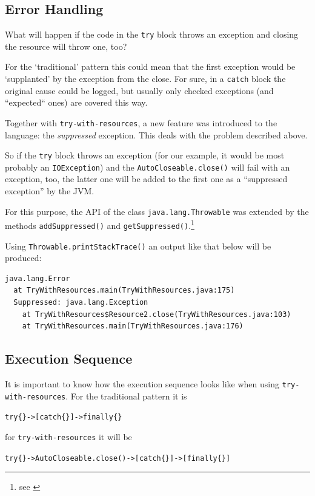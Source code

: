 \documentclass[11pt,a4paper, titlepage, parskip=half, headsepline, footsepline, cleardoublepage=current, headheight=1cm]{scrbook}
\begin{document}
\subsection{Error Handling}
What will happen if the code in the \lstinline|try| block throws an exception and closing the resource will throw one, too?

For the ‘traditional’ pattern this could mean that the first exception would be ‘supplanted’ by the exception from the close. For sure, in a \lstinline|catch| block the original cause could be logged, but usually only checked exceptions (and “expected“ ones) are covered this way.

Together with \lstinline|try-with-resources|, a new feature was introduced to the language: the \textit{suppressed} exception. This deals with the problem described above.

So if the \lstinline|try| block throws an exception (for our example, it would be most probably an \lstinline|IOException|) and the \lstinline|AutoCloseable.close()| will fail with an exception, too, the latter one will be added to the first one as a “suppressed exception” by the JVM.

For this purpose, the API of the class \lstinline|java.lang.Throwable| was extended by the methods \lstinline|addSuppressed()| and \lstinline|getSuppressed()|.\footnote{see \autocite{ORACLE_DOC_THROWABLE_CLASS}}

Using \lstinline|Throwable.printStackTrace()| an output like that below will be produced:
\begin{lstlisting}
java.lang.Error
  at TryWithResources.main(TryWithResources.java:175)
  Suppressed: java.lang.Exception
    at TryWithResources$Resource2.close(TryWithResources.java:103)
    at TryWithResources.main(TryWithResources.java:176)
\end{lstlisting}

\subsection{Execution Sequence}\label{sec:ExecutionSequence}
It is important to know how the execution sequence looks like when using \lstinline|try-with-resources|. For the traditional pattern it is\\
\begin{center}
\verb#try{}->[catch{}]->finally{}#
\end{center} 
for \lstinline|try-with-resources| it will be\\ 
\begin{center}
\verb#try{}->AutoCloseable.close()->[catch{}]->[finally{}]#
\end{center}
\end{document}
